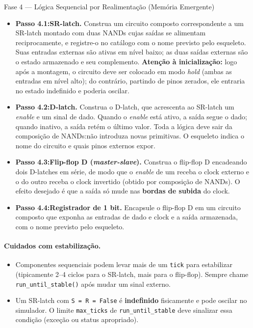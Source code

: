 \documentclass[11pt,a4paper]{article}
\begin{document}
\begin{phasebox}{Fase 4 — Lógica Sequencial por Realimentação (Memória Emergente)}{}
\begin{itemize}
    \item \textbf{Passo 4.1:SR-latch.} Construa um circuito composto correspondente a um SR-latch montado com duas NANDs cujas saídas se alimentam reciprocamente, e registre-o no catálogo com o nome previsto pelo esqueleto. Suas entradas externas são ativas em nível baixo; as duas saídas externas são o estado armazenado e seu complemento. \textbf{Atenção à inicialização:} logo após a montagem, o circuito deve ser colocado em modo \emph{hold} (ambas as entradas em nível alto); do contrário, partindo de pinos zerados, ele entraria no estado indefinido e poderia oscilar.
    \item \textbf{Passo 4.2:D-latch.} Construa o D-latch, que acrescenta ao SR-latch um \emph{enable} e um sinal de dado. Quando o \emph{enable} está ativo, a saída segue o dado; quando inativo, a saída retém o último valor. Toda a lógica deve sair da composição de NANDs:não introduza novas primitivas. O esqueleto indica o nome do circuito e quais pinos externos expor.
    \item \textbf{Passo 4.3:Flip-flop D (\textit{master-slave}).} Construa o flip-flop D encadeando dois D-latches em série, de modo que o \emph{enable} de um receba o clock externo e o do outro receba o clock invertido (obtido por composição de NANDs). O efeito desejado é que a saída só mude nas \textbf{bordas de subida} do clock.
    \item \textbf{Passo 4.4:Registrador de 1 bit.} Encapsule o flip-flop D em um circuito composto que exponha as entradas de dado e clock e a saída armazenada, com o nome previsto pelo esqueleto.
\end{itemize}

\paragraph{Cuidados com estabilização.}
\begin{itemize}
    \item Componentes sequenciais podem levar mais de um \texttt{tick} para estabilizar (tipicamente 2--4 ciclos para o SR-latch, mais para o flip-flop). Sempre chame \texttt{run\_until\_stable()} após mudar um sinal externo.
    \item Um SR-latch com \texttt{S = R = False} é \textbf{indefinido} fisicamente e pode oscilar no simulador. O limite \texttt{max\_ticks} de \texttt{run\_until\_stable} deve sinalizar essa condição (exceção ou status apropriado).
\end{itemize}


\end{phasebox}
\end{document}
